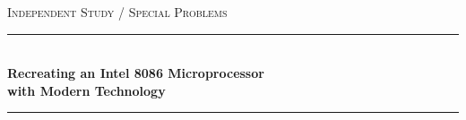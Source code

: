 %
%
\begin{titlepage}

\newcommand{\HRule}{\rule{\linewidth}{0.5mm}} %
\vspace*{\fill} %
\center %

 
 

\textsc{\Large Independent Study / Special Problems}\\[0.5cm] %


\HRule \\[0.4cm]
{ \huge \bfseries Recreating an Intel 8086 Microprocessor\\ with Modern Technology }\\[0.4cm] %
\HRule \\[1.5cm]

 


\end{titlepage}
